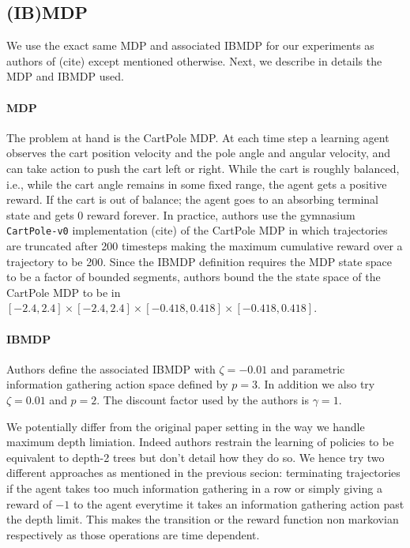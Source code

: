 \subsection{(IB)MDP} 

We use the exact same MDP and associated IBMDP for our experiments as authors of (cite) except mentioned otherwise. Next, we describe in details the MDP and IBMDP used.

\paragraph{MDP} The problem at hand is the CartPole MDP. At each time step a learning agent observes the cart position velocity and the pole angle and angular velocity, and can take action to push the cart left or right. While the cart is roughly balanced, i.e., while the cart angle remains in some fixed range, the agent gets a positive reward.
If the cart is out of balance; the agent goes to an absorbing terminal state and gets 0 reward forever.
In practice, authors use the gymnasium \texttt{CartPole-v0} implementation (cite) of the CartPole MDP in which trajectories are truncated after 200 timesteps making the maximum cumulative reward over a trajectory to be 200.
Since the IBMDP definition requires the MDP state space to be a factor of bounded segments, authors bound the the state space of the CartPole MDP to be in $[-2.4, 2.4] \times [-2.4, 2.4] \times [-0.418, 0.418] \times [-0.418, 0.418]$.

\paragraph{IBMDP} Authors define the associated IBMDP with $\zeta=-0.01$ and parametric information gathering action space defined by $p=3$.
In addition we also try $\zeta=0.01$ and $p=2$.
The discount factor used by the authors is $\gamma=1$.

We potentially differ from the original paper setting in the way we handle maximum depth limiation. 
Indeed authors restrain the learning of policies to be equivalent to depth-2 trees but don't detail how they do so.
We hence try two different approaches as mentioned in the previous secion: terminating trajectories if the agent takes too much information gathering in a row or simply giving a reward of $-1$ to the agent everytime it takes an information gathering action past the depth limit.
This makes the transition or the reward function non markovian respectively as those operations are time dependent.

